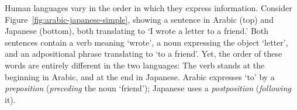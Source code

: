\documentclass[9pt,twocolumn,twoside,lineno]{pnas-new}
\begin{document}





Human languages vary in the order in which they express information.
Consider Figure~\ref{fig:arabic-japanese-simple}, showing a sentence in Arabic (top) and Japanese (bottom), both translating to `I wrote a letter to a friend.'
Both sentences contain a verb meaning `wrote', a noun expressing  the object `letter', and an adpositional phrase translating to `to a friend'.
Yet, the order of these words are entirely different in the two languages:
The verb stands at the beginning in Arabic, and at the end in Japanese.
Arabic expresses `to' by a \emph{preposition} (\emph{preceding} the noun `friend'); Japanese uses a \emph{postposition} (\emph{following} it). %
\end{document}
